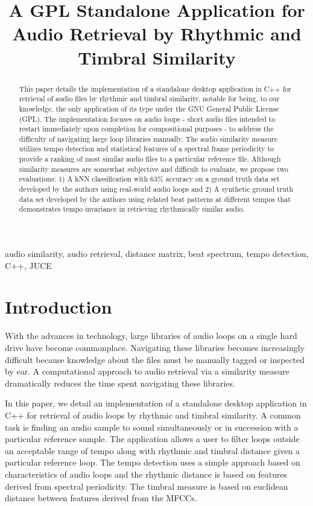 \documentclass{article}
\title{A GPL Standalone Application for Audio Retrieval by Rhythmic and Timbral Similarity}
\begin{document}
%
\maketitle
%
\begin{abstract}
This paper details the implementation of a standalone desktop application in C++ for retrieval of audio files by rhythmic and timbral similarity, notable for being, to our knowledge, the only application of its type under the GNU General Public License (GPL). The implementation focuses on audio loops - short audio files intended to restart immediately upon completion for compositional purposes - to address the difficulty of navigating large loop libraries manually. The audio similarity measure utilizes tempo detection and statistical features of a spectral frame periodicity to provide a ranking of most similar audio files to a particular reference file. Although similarity measures are somewhat subjective and difficult to evaluate, we propose two evaluations: 1) A kNN classification with 63\% accuracy on a ground truth data set developed by the authors using real-world audio loops and 2) A synthetic ground truth data set developed by the authors using related beat patterns at different tempos that demonstrates tempo invariance in retrieving rhythmically similar audio. \cite{audiocompare}
\end{abstract}
%
\begin{keywords}
audio similarity, audio retrieval, distance matrix, beat spectrum, tempo detection, C++, JUCE
\end{keywords}
%
\section{Introduction}

With the advances in technology, large libraries of audio loops on a single hard drive have become commonplace. Navigating these libraries becomes increasingly difficult because knowledge about the files must be manually tagged or inspected by ear. A computational approach to audio retrieval via a similarity measure dramatically reduces the time spent navigating these libraries.

In this paper, we detail an implementation of a standalone desktop application in C++ for retrieval of audio loops by rhythmic and timbral similarity. A common task is finding an audio sample to sound simultaneously or in succession with a particular reference sample. The application allows a user to filter loops outside an acceptable range of tempo along with rhythmic and timbral distance given a particular reference loop. The tempo detection uses a simple approach based on characteristics of audio loops and the rhythmic distance is based on features derived from spectral periodicity. The timbral measure is based on euclidean distance between features derived from the MFCCs.
\end{document}
